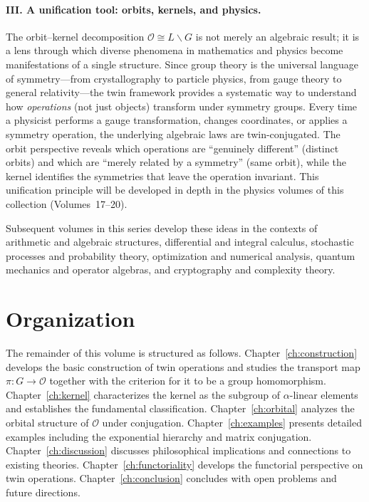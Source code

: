 \documentclass[11pt,a4paper,openany]{book}
\theoremstyle{plain}
\theoremstyle{definition}
\newcommand{\opspace}{\mathcal{O}}
\newcommand{\lingroup}{L}
\newcommand{\groupG}{G}
\begin{document}
\paragraph{III. A unification tool: orbits, kernels, and physics.} The orbit--kernel decomposition $\opspace \cong \lingroup\backslash\groupG$ is not merely an algebraic result; it is a lens through which diverse phenomena in mathematics and physics become manifestations of a single structure. Since group theory is the universal language of symmetry---from crystallography to particle physics, from gauge theory to general relativity---the twin framework provides a systematic way to understand how \emph{operations} (not just objects) transform under symmetry groups. Every time a physicist performs a gauge transformation, changes coordinates, or applies a symmetry operation, the underlying algebraic laws are twin-conjugated. The orbit perspective reveals which operations are ``genuinely different'' (distinct orbits) and which are ``merely related by a symmetry'' (same orbit), while the kernel identifies the symmetries that leave the operation invariant. This unification principle will be developed in depth in the physics volumes of this collection (Volumes~17--20).

Subsequent volumes in this series develop these ideas in the contexts of arithmetic and algebraic structures, differential and integral calculus, stochastic processes and probability theory, optimization and numerical analysis, quantum mechanics and operator algebras, and cryptography and complexity theory.

\section{Organization}

The remainder of this volume is structured as follows. Chapter~\ref{ch:construction} develops the basic construction of twin operations and studies the transport map $\pi: \groupG \to \opspace$ together with the criterion for it to be a group homomorphism. Chapter~\ref{ch:kernel} characterizes the kernel as the subgroup of $\alpha$-linear elements and establishes the fundamental classification. Chapter~\ref{ch:orbital} analyzes the orbital structure of $\opspace$ under conjugation. Chapter~\ref{ch:examples} presents detailed examples including the exponential hierarchy and matrix conjugation. Chapter~\ref{ch:discussion} discusses philosophical implications and connections to existing theories. Chapter~\ref{ch:functoriality} develops the functorial perspective on twin operations. Chapter~\ref{ch:conclusion} concludes with open problems and future directions.
\end{document}
